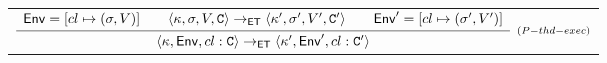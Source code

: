 \begin{figure}
\begin{tabular}{|@{}c@{}|}
\hline
$
\infer[{\scriptstyle(P-thd-exec)}]{\langle \hh, \mathsf{Env}, \tid: \cmd \rangle \rightarrow_{\ET} \langle \hh', \mathsf{Env}', \tid: \cmd' \rangle}
{
\begin{array}{c}
\mathsf{Env} = [\tid \mapsto (\sigma, V)] \qquad \langle \hh, \thdstack, V, \cmd \rangle \rightarrow_{\ET} \langle \hh', \thdstack', V', \cmd' \rangle 
\qquad \mathsf{Env}' = [\tid \mapsto (\sigma', V')]\\
\end{array}
}
$
\\[8pt]
%
%


\end{tabular}
\end{figure}
